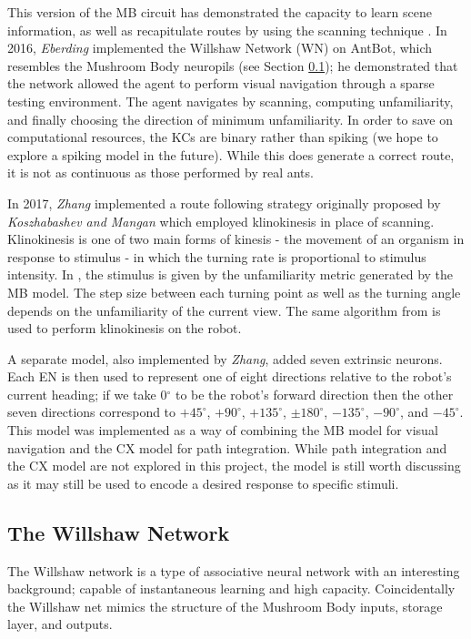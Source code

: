 \documentclass[a4paper,12pt,twoside,openright]{article}
\begin{document}
This version of the MB circuit has demonstrated the capacity to learn scene information, as well
as recapitulate routes by using the scanning technique \cite{Ardin2016}. In 2016, \textit{Eberding}
implemented the Willshaw Network (WN) on AntBot, which resembles the Mushroom Body neuropils (see Section \ref{sec:wn}); he
demonstrated that the network allowed the agent to perform visual navigation through a sparse testing
environment\cite{Eberding2016}. The agent navigates by scanning, computing unfamiliarity, and finally
choosing the direction of minimum unfamiliarity. In order to save on computational resources, the
KCs are binary rather than spiking (we hope to explore a spiking model in the future). While this does
generate a correct route, it is not as continuous as those performed by real ants.
\newline

In 2017, \textit{Zhang} implemented a route following strategy originally proposed by
\textit{Koszhabashev and Mangan} which employed klinokinesis in place of scanning. Klinokinesis
is one of two main forms of kinesis - the movement of an organism in response to stimulus - in which
the turning rate is proportional to stimulus intensity. In \cite{Zhang2017}, the
stimulus is given by the unfamiliarity metric generated by the MB model. The step size between each
turning point as well as the turning angle depends on the unfamiliarity of the current view. The same
algorithm from \cite{Kodzhabashev2015} is used to perform klinokinesis on the robot.
\newline

A separate model, also implemented by \textit{Zhang}, added seven extrinsic neurons. Each EN is then
used to represent one of eight directions relative to the robot's current heading; if we take 0$^\circ$
to be the robot's forward direction then the other seven directions correspond to $+45^\circ$,
$+90^\circ$, $+135^\circ$, $\pm180^\circ$, $-135^\circ$, $-90^\circ$, and $-45^\circ$. This model was implemented as a way of
combining the MB model for visual navigation and the CX model for path integration. While path
integration and the CX model are not explored in this project, the model is still worth discussing
as it may still be used to encode a desired response to specific stimuli.


\subsection{The Willshaw Network} \label{sec:wn}
The Willshaw network is a type of associative neural network with an interesting background; capable of
instantaneous learning and high capacity. Coincidentally the Willshaw net mimics the structure of the Mushroom Body
inputs, storage layer, and outputs.
\newline
\end{document}
